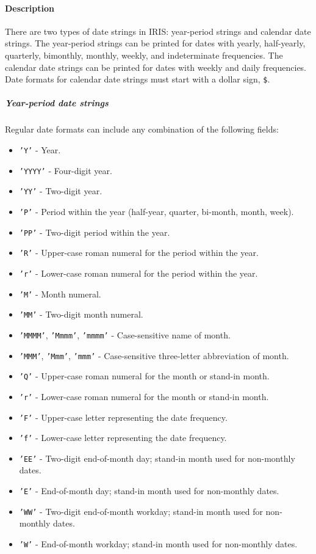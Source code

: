  \paragraph{Description}
 
 There are two types of date strings in IRIS: year-period strings and
 calendar date strings. The year-period strings can be printed for dates
 with yearly, half-yearly, quarterly, bimonthly, monthly, weekly, and
 indeterminate frequencies. The calendar date strings can be printed for
 dates with weekly and daily frequencies. Date formats for calendar date
 strings must start with a dollar sign, \texttt{\$}.
 
 \subparagraph{Year-period date strings}
 
 Regular date formats can include any combination of the following
 fields:
 
 \begin{itemize}
 \item
   \texttt{'Y'} - Year.
 \item
   \texttt{'YYYY'} - Four-digit year.
 \item
   \texttt{'YY'} - Two-digit year.
 \item
   \texttt{'P'} - Period within the year (half-year, quarter, bi-month,
   month, week).
 \item
   \texttt{'PP'} - Two-digit period within the year.
 \item
   \texttt{'R'} - Upper-case roman numeral for the period within the
   year.
 \item
   \texttt{'r'} - Lower-case roman numeral for the period within the
   year.
 \item
   \texttt{'M'} - Month numeral.
 \item
   \texttt{'MM'} - Two-digit month numeral.
 \item
   \texttt{'MMMM'}, \texttt{'Mmmm'}, \texttt{'mmmm'} - Case-sensitive
   name of month.
 \item
   \texttt{'MMM'}, \texttt{'Mmm'}, \texttt{'mmm'} - Case-sensitive
   three-letter abbreviation of month.
 \item
   \texttt{'Q'} - Upper-case roman numeral for the month or stand-in
   month.
 \item
   \texttt{'r'} - Lower-case roman numeral for the month or stand-in
   month.
 \item
   \texttt{'F'} - Upper-case letter representing the date frequency.
 \item
   \texttt{'f'} - Lower-case letter representing the date frequency.
 \item
   \texttt{'EE'} - Two-digit end-of-month day; stand-in month used for
   non-monthly dates.
 \item
   \texttt{'E'} - End-of-month day; stand-in month used for non-monthly
   dates.
 \item
   \texttt{'WW'} - Two-digit end-of-month workday; stand-in month used
   for non-monthly dates.
 \item
   \texttt{'W'} - End-of-month workday; stand-in month used for
   non-monthly dates.
 \end{itemize}
 
